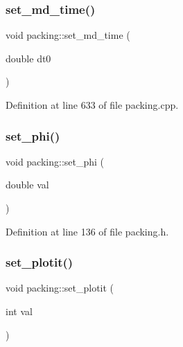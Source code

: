 \mbox{\label{classpacking_aab96c0f738b9ff52cf5eb9deba301387}} 
\subsubsection{\texorpdfstring{set\+\_\+md\+\_\+time()}{set\_md\_time()}}
{\footnotesize\ttfamily void packing\+::set\+\_\+md\+\_\+time (\begin{DoxyParamCaption}\item[{double}]{dt0 }\end{DoxyParamCaption})}



Definition at line 633 of file packing.\+cpp.

\mbox{\label{classpacking_af02fd953055fe009e6d3e79cc7a22eb8}} 
\subsubsection{\texorpdfstring{set\+\_\+phi()}{set\_phi()}}
{\footnotesize\ttfamily void packing\+::set\+\_\+phi (\begin{DoxyParamCaption}\item[{double}]{val }\end{DoxyParamCaption})\hspace{0.3cm}{\ttfamily [inline]}}



Definition at line 136 of file packing.\+h.

\mbox{\label{classpacking_a9bfa5637ac07f61d5cd34655c3a36455}} 
\subsubsection{\texorpdfstring{set\+\_\+plotit()}{set\_plotit()}}
{\footnotesize\ttfamily void packing\+::set\+\_\+plotit (\begin{DoxyParamCaption}\item[{int}]{val }\end{DoxyParamCaption})\hspace{0.3cm}{\ttfamily [inline]}}




